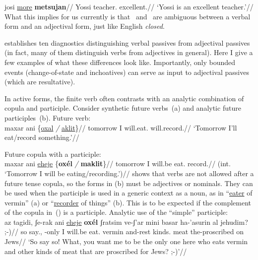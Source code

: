 	\a \begingl
		\gla josi \underline{more} \textbf{metsujan}//
		\glb Yossi teacher. excellent.//
		\glft `Yossi is an excellent teacher.'//
	\endgl
\xe
What this implies for us currently is that \mpua~and \mhuf~are ambiguous between a verbal form and an adjectival form, just like English \emph{closed}.

\cite{doron00} establishes ten diagnostics distinguishing verbal passives from adjectival passives (in fact, many of them distinguish verbs from adjectives in general). Here I give a few examples of what these differences look like. Importantly, only bounded events (change-of-state and inchoatives) can serve as input to adjectival passives (which are resultative).

In active forms, the finite verb often contrasts with an analytic combination of copula and participle. Consider synthetic future verbs~(\nextx a) and analytic future participles~(\nextx b).
\pex \label{ex:pres-act}
 \a Future verb:\\
 \begingl
     \gla maxar ani \{\underline{oxal} \emph{/} \underline{aklit}\}//
     \glb tomorrow I will.eat. {} will.record.//
     \glft `Tomorrow I'll eat/record something.'//
 \endgl

 \a Future copula with a participle:\\
 \begingl
     \gla \ljudge{*}maxar ani \underline{eheje} \{\textbf{ox\'el} \emph{/} \textbf{maklit}\}//
     \glb tomorrow I will.be eat. {} record.//
     \glft (int. `Tomorrow I will be eating/recording.')//
 \endgl
\xe
\cite{doron00} shows that verbs are not allowed after a future tense copula, so the forms in (\lastx b) must be adjectives or nominals. They can be used when the participle is used in a generic context as a noun, as in ``\underline{eater} of vermin'' (\nextx a) or ``\underline{recorder} of things'' (\nextx b). This is to be expected if the complement of the copula in~(\nextx) is a participle.
\pex \label{ex:pres-act2}
 \a Analytic use of the ``simple'' participle:\\
 \begingl
     \gla az tagidi, ʃe-rak ani \underline{eheje} \textbf{ox\'el} ʃratsim ve-ʃ'ar mini basar ha-'asurin al jehudim? ;-)//
     \glb so say., -only I will.be eat. vermin and-rest kinds. meat the-proscribed on Jews//
     \glft `So say so! What, you want me to be the only one here who eats vermin and other kinds of meat that are proscribed for Jews? ;-)'\footnotemark//
 \endgl
{}

